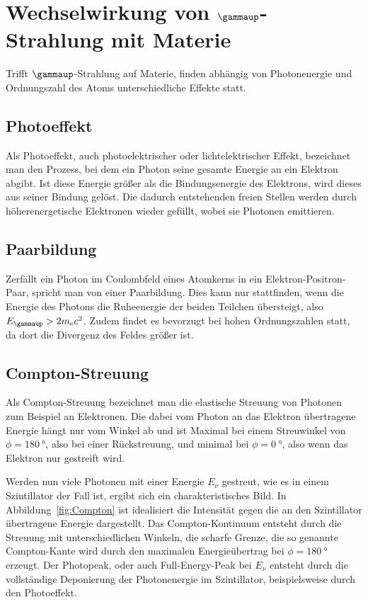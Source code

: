 \section{Wechselwirkung von $\gammaup$-Strahlung mit Materie}
\label{sec:WW}

Trifft $\gammaup$-Strahlung auf Materie, finden abhängig von Photonenergie und
Ordnungszahl des Atoms unterschiedliche Effekte statt.

\subsection{Photoeffekt}

Als Photoeffekt, auch photoelektrischer oder lichtelektrischer Effekt,
bezeichnet man den Prozess, bei dem ein Photon seine gesamte Energie an ein
Elektron abgibt. Ist diese Energie größer als die Bindungsenergie des
Elektrons, wird dieses aus seiner Bindung gelöst. Die dadurch entstehenden
freien Stellen werden durch höherenergetische Elektronen wieder gefüllt, wobei
sie Photonen emittieren.

\subsection{Paarbildung}

Zerfällt ein Photon im Coulombfeld eines Atomkerns in ein
Elektron-Positron-Paar, spricht man von einer Paarbildung. Dies kann nur
stattfinden, wenn die Energie des Photons die Ruheenergie der beiden Teilchen
übersteigt, also $E_\gammaup > 2m_\mathrm{e}c^2$. Zudem findet es bevorzugt bei
hohen Ordnungszahlen statt, da dort die Divergenz des Feldes größer ist.

\subsection{Compton-Streuung}

Als Compton-Streuung bezeichnet man die elastische Streuung von Photonen zum
Beispiel an Elektronen. Die dabei vom Photon an das Elektron übertragene
Energie hängt nur vom Winkel ab und ist Maximal bei einem Streuwinkel von $\phi
= \SI{180}\degree$, also bei einer Rückstreuung, und minimal bei $\phi =
\SI{0}\degree$, also wenn das Elektron nur gestreift wird.

Werden nun viele Photonen mit einer Energie $E_\nu$ gestreut, wie es in einem
Szintillator der Fall ist, ergibt sich ein charakteristisches Bild. In
Abbildung~\ref{fig:Compton} ist idealisiert die Intensität gegen die an den
Szintillator übertragene Energie dargestellt. Das Compton-Kontinuum entsteht
durch die Streuung mit unterschiedlichen Winkeln, die scharfe Grenze, die so
genannte Compton-Kante wird durch den maximalen Energieübertrag bei $\phi =
\SI{180}{\degree}$ erzeugt. Der Photopeak, oder auch Full-Energy-Peak bei
$E_\nu$ entsteht durch die vollständige Deponierung der Photonenergie im
Szintillator, beispielsweise durch den Photoeffekt.

